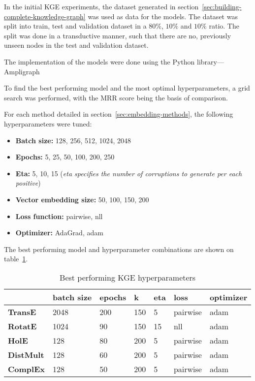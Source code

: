 In the initial KGE experiments, the dataset generated in section~\ref{sec:building-complete-knowledge-graph} was used as data for the models.
The dataset was split into train, test and validation dataset in a $80\%$, $10\%$ and $10\%$ ratio.
The split was done in a transductive manner, such that there are no, previously unseen nodes in the test and validation
dataset.

The implementation of the models were done using the Python library—Ampligraph~\cite{ampligraph}

To find the best performing model and the most optimal hyperparameters, a grid search was performed, with the MRR score
being the basis of comparison.

For each method detailed in section~\ref{sec:embedding-methods}, the following hyperparameters were tuned:
\begin{itemize}
    \item \textbf{Batch size:} 128, 256, 512, 1024, 2048
    \item \textbf{Epochs:} 5, 25, 50, 100, 200, 250
    \item \textbf{Eta:} 5, 10, 15 (\textit{eta specifies the number of corruptions to generate per each positive})
    \item \textbf{Vector embedding size:} 50, 100, 150, 200
    \item \textbf{Loss function:} pairwise, nll
    \item \textbf{Optimizer:} AdaGrad, adam
\end{itemize}

The best performing model and hyperparameter combinations are shown on table~\ref{tab:kge-params}.

\begin{table}[!ht]
    \centering
    \begin{tabular}{|l|l|l|l|l|l|l|}
        \hline
        & \textbf{batch size} & \textbf{epochs} & \textbf{k} & \textbf{eta} & \textbf{loss} & \textbf{optimizer} \\ \hline
        \textbf{TransE} & 2048 & 200 & 150 & 5 & pairwise & adam \\ \hline
        \textbf{RotatE} & 1024 & 90 & 150 & 15 & nll & adam \\ \hline
        \textbf{HolE} & 128 & 80 & 200 & 5 & pairwise & adam \\ \hline
        \textbf{DistMult} & 128 & 60 & 200 & 5 & pairwise & adam \\ \hline
        \textbf{ComplEx} & 128 & 50 & 200 & 5 & pairwise & adam \\ \hline
    \end{tabular}
    \caption{Best performing KGE hyperparameters}
    \label{tab:kge-params}
\end{table}
